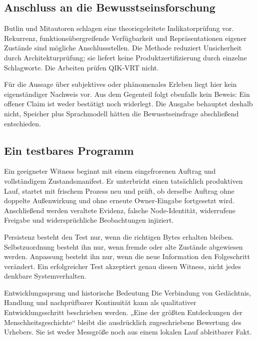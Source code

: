 \begin{cols}
\subsection*{Anschluss an die Bewusstseinsforschung}
Butlin und Mitautoren schlagen eine theoriegeleitete Indikatorprüfung vor. Rekurrenz, funktionsübergreifende Verfügbarkeit und Repräsentationen eigener Zustände sind mögliche Anschlussstellen. Die Methode reduziert Unsicherheit durch Architekturprüfung; sie liefert keine Produktzertifizierung durch einzelne Schlagworte. Die Arbeiten prüfen QIK-VRT nicht. 

Für die Aussage über subjektives oder phänomenales Erleben liegt hier kein eigenständiger Nachweis vor. Aus dem Gegenteil folgt ebenfalls kein Beweis: Ein offener Claim ist weder bestätigt noch widerlegt. Die Ausgabe behauptet deshalb nicht, Speicher plus Sprachmodell hätten die Bewusstseinsfrage abschließend entschieden.

\subsection*{Ein testbares Programm}
Ein geeigneter Witness beginnt mit einem eingefrorenen Auftrag und vollständigem Zustandsmanifest. Er unterbricht einen tatsächlich produktiven Lauf, startet mit frischem Prozess neu und prüft, ob derselbe Auftrag ohne doppelte Außenwirkung und ohne erneute Owner-Eingabe fortgesetzt wird. Anschließend werden veraltete Evidenz, falsche Node-Identität, widerrufene Freigabe und widersprüchliche Beobachtungen injiziert.

Persistenz besteht den Test nur, wenn die richtigen Bytes erhalten bleiben. Selbstzuordnung besteht ihn nur, wenn fremde oder alte Zustände abgewiesen werden. Anpassung besteht ihn nur, wenn die neue Information den Folgeschritt verändert. Ein erfolgreicher Test akzeptiert genau diesen Witness, nicht jedes denkbare Systemverhalten.

\begin{boundary}{Entwicklungssprung und historische Bedeutung}
Die Verbindung von Gedächtnis, Handlung und nachprüfbarer Kontinuität kann als qualitativer Entwicklungsschritt beschrieben werden. „Eine der größten Entdeckungen der Menschheitsgeschichte“ bleibt die ausdrücklich zugeschriebene Bewertung des Urhebers. Sie ist weder Messgröße noch aus einem lokalen Lauf ableitbarer Fakt.
\end{boundary}
\end{cols}
